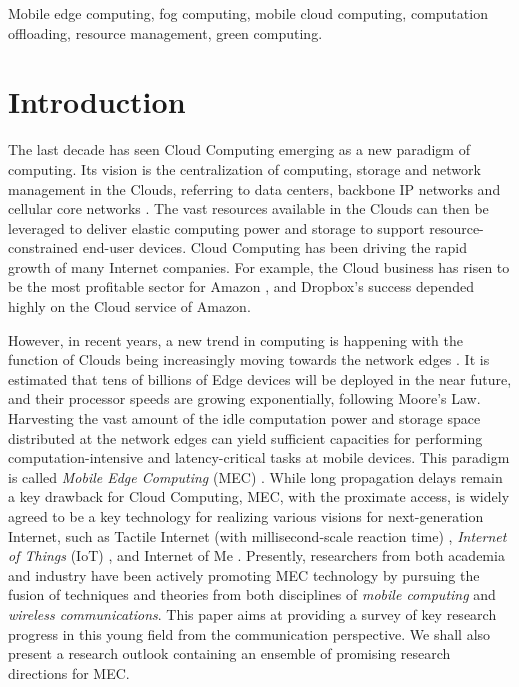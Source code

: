\documentclass[journal]{IEEEtran}
\begin{document}
\begin{IEEEkeywords}
Mobile edge computing, fog computing, mobile cloud computing, computation offloading, resource management, green computing.
\end{IEEEkeywords}


\IEEEpeerreviewmaketitle
\section{Introduction}
The last decade has seen Cloud Computing emerging as a new paradigm of computing. Its vision is the centralization of computing, storage and network management in the Clouds, referring to data centers, backbone IP networks and cellular core networks \cite{MArmbrust0902,zhang2010cloud}. The vast resources available in the Clouds can then be leveraged to deliver elastic computing power and storage to support resource-constrained end-user devices. Cloud Computing has been driving the rapid growth of many Internet companies. For example, the Cloud business has risen to be the most profitable sector for Amazon \cite{NYTimes16},  and Dropbox's success depended highly on the Cloud service of Amazon.

However, in recent years, a new trend in computing is happening with the function of Clouds being increasingly moving towards the network edges \cite{chiangfog}. It is estimated that tens of billions of Edge devices will be deployed in the near future, and their processor speeds are growing exponentially, following Moore's Law. Harvesting the vast amount of the idle computation power and storage space distributed at the network edges can yield sufficient capacities for performing computation-intensive and latency-critical tasks at mobile devices. This paradigm is called \emph{Mobile Edge Computing} (MEC) \cite{ETSI14}. While long propagation delays remain a key drawback for Cloud Computing, MEC, with the proximate access, is widely agreed to  be a key technology for realizing various visions for next-generation Internet, such as Tactile Internet (with millisecond-scale reaction time) \cite{Fettweis1403}, \emph{Internet of Things} (IoT) \cite{Fuqaha1506}, and Internet of Me \cite{JuniperResearch}. Presently, researchers from both academia and industry have been actively promoting MEC technology by pursuing the fusion of techniques and theories from both disciplines of \emph{mobile computing} and \emph{wireless communications}. This paper aims at providing a survey of key research progress in this young field from the communication perspective. We shall also present a research outlook containing   an ensemble  of promising research directions for MEC.
\end{document}
